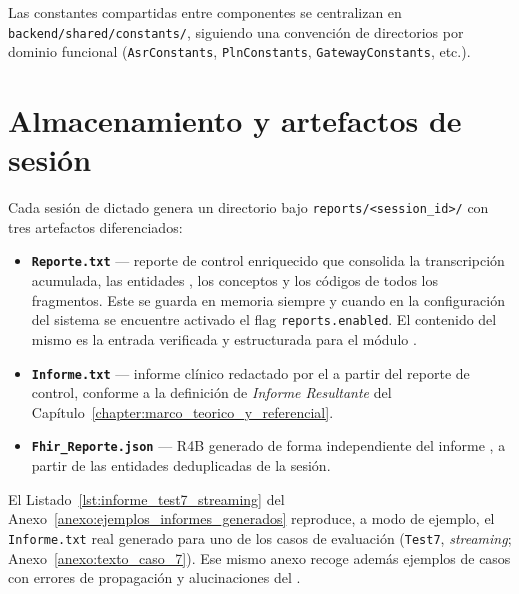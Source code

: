 

Las constantes compartidas entre componentes se centralizan en \texttt{backend/shared/constants/},
siguiendo una convención de directorios por dominio funcional (\texttt{AsrConstants},
\texttt{PlnConstants}, \texttt{GatewayConstants}, etc.).

\section{Almacenamiento y artefactos de sesión}\label{section:almacenamiento}

Cada sesión de dictado genera un directorio bajo \texttt{reports/<session\_id>/} con tres artefactos
diferenciados:

\begin{itemize}
    \item \textbf{\texttt{Reporte.txt}} --- reporte de control enriquecido que consolida la
    transcripción acumulada, las entidades , los conceptos 
    y los códigos  de todos los fragmentos. Este se guarda en memoria siempre
    y cuando en la configuración del sistema se encuentre activado el flag \texttt{reports.enabled}.
    El contenido del mismo es la entrada verificada y estructurada para el módulo .
    \item \textbf{\texttt{Informe.txt}} --- informe clínico redactado por el  a
    partir del reporte de control, conforme a la definición de \textit{Informe Resultante} del
    Capítulo~\ref{chapter:marco_teorico_y_referencial}.
    \item \textbf{\texttt{Fhir\_Reporte.json}} ---  R4B generado de forma
    independiente del informe , a partir de las entidades deduplicadas de la sesión.
\end{itemize}

El Listado~\ref{lst:informe_test7_streaming} del Anexo~\ref{anexo:ejemplos_informes_generados}
reproduce, a modo de ejemplo, el \texttt{Informe.txt} real generado para uno de los casos de
evaluación (\texttt{Test7}, \textit{streaming}; Anexo~\ref{anexo:texto_caso_7}). Ese mismo anexo
recoge además ejemplos de casos con errores de propagación y alucinaciones del .